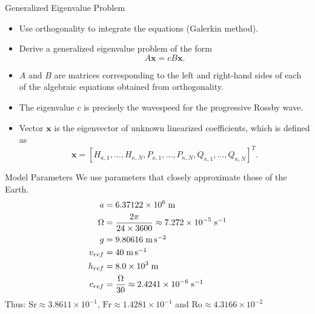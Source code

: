 \documentclass[pdf,distiller]{prosper}
\newcommand\mpers{\nobreak\mbox{$\;$m\,s$^{-1}$}}
\newcommand\meters{\nobreak\mbox{$\;$m}}
\newcommand\persec{\nobreak\mbox{$\;$s$^{-1}$}}
\newcommand\mperss{\nobreak\mbox{$\;$m\,s$^{-2}$}}
\begin{document}
\begin{slide}{Generalized Eigenvalue Problem}
\begin{itemize}
\item Use orthogonality to integrate the equations (Galerkin method).
\item Derive a generalized eigenvalue problem of the form\\
\begin{equation*}
A \boldsymbol{x} = c B \boldsymbol{x}.
\end{equation*}
\item $A$ and $B$ are matrices corresponding to the left and right-hand sides of each of the algebraic equations obtained from orthogonality.
\item The eigenvalue $c$ is precisely the wavespeed for the progressive Rossby wave.
\item Vector $\boldsymbol{x}$ is the eigenvector of unknown linearized coefficients, which is defined as\\
\begin{equation*}
\boldsymbol{x} = \left[H_{\kappa,1}, \ldots, H_{\kappa,N}, P_{\kappa,1}, \ldots, P_{\kappa,N}, Q_{\kappa,1}, \ldots, Q_{\kappa,N} \right]^{T}.
\end{equation*}
\end{itemize}
\end{slide}

\begin{slide}{Model Parameters}
We use parameters that closely approximate those of the Earth.
\begin{align*}
a&=6.37122\times10^6\meters\\
\Omega&=\frac{2 \pi}{24\times3600}\approx7.272\times10^{-5}\persec\\
g&=9.80616\mperss \\
v_{\scriptstyle ref}& = 40\mpers\\
h_{\scriptstyle ref}& = 8.0\times10^{3}\meters\\
c_{\scriptstyle ref}& = \frac{\Omega}{30}\approx2.4241\times10^{-6}\persec
\end{align*}
Thus: $\mathrm{Sr} \approx3.8611 \times 10^{-1}$, $\mathrm{Fr} \approx1.4281 \times 10^{-1}$ and $\mathrm{Ro} \approx 4.3166 \times 10^{-2}$
\end{slide}
\end{document}

